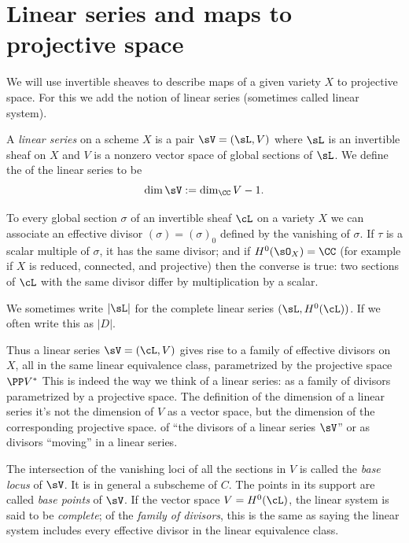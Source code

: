 \section{Linear series and maps to projective space}

We will use invertible sheaves to  describe maps of a given variety $X$ to projective space. For this we add the notion of linear series (sometimes called linear system). 
%
%

\begin{definition}
 A \emph{linear series} on a scheme $X$ is a pair $\sV  = (\sL, V)$ where $\sL$ is an invertible sheaf  on $X$ and
 $V$ is a nonzero vector space of global sections of $\sL$. We define the 
%
of the linear series to be  
 $$
 \dim \sV := \dim_\CC V -1.
 $$
  \end{definition}
  
To every global section $\sigma$ of an invertible sheaf $\cL$ on a variety $X$  we can associate an effective divisor $(\sigma) = (\sigma)_0$ defined by the vanishing of $\sigma$. If $\tau$ is a scalar multiple of $\sigma$, it has the same divisor; and if 
 $H^0(\sO_X) = \CC$ (for example if $X$ is reduced, connected, and
 projective) then the converse is true: two sections of $\cL$ with the same divisor differ by multiplication by a scalar.  
 
 We sometimes write
 $|\sL|$ for the complete linear series $(\sL, H^0(\cL))$. If 
%
 we often write this as $|D|$.

Thus a linear series $\sV = (\cL, V)$ gives rise to a family of
effective divisors on $X$, all in the same linear equivalence class,
parametrized by the projective space $\PP V^*$ 
This is indeed the way 
we think of a linear series: as a family of divisors parametrized by a
projective space.
The definition of the dimension
of a linear series 
it's not the dimension of $V$ as a vector
space, but the dimension of the corresponding projective space. 
 of ``the divisors of
a linear series $\sV$'' or as divisors ``moving'' in a linear series.

The intersection of the vanishing loci of all the sections in $V$ is
%
called the \emph{base locus} of $\sV$. It is in general a subscheme of
$C$. The points in its support are called \emph{base points} of $\sV$.
If the vector space $V = H^0(\cL)$, the linear system is said to be
%
\emph{complete}; 
of the \emph{family of divisors},
%
this is the same as saying the linear system includes every
effective divisor in the linear equivalence class. 
 
